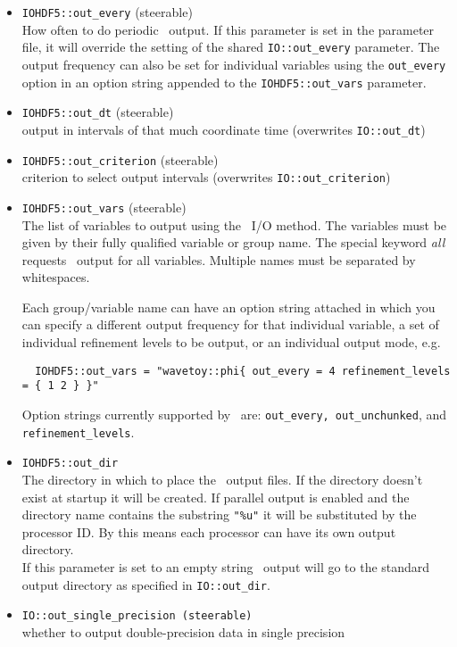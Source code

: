 \documentclass{article}
\begin{document}
\begin{itemize}
  \item {\tt IOHDF5::out\_every} (steerable)\\
        How often to do periodic \ThisThorn\ output. If this parameter is set
        in the parameter file, it will override the setting of the shared
        {\tt IO::out\_every} parameter. The output frequency can also be set
        for individual variables using the {\tt out\_every} option in an option
        string appended to the {\tt IOHDF5::out\_vars} parameter.

  \item {\tt IOHDF5::out\_dt} (steerable)\\
        output in intervals of that much coordinate time (overwrites {\tt IO::out\_dt})

  \item {\tt IOHDF5::out\_criterion} (steerable)\\
        criterion to select output intervals (overwrites {\tt IO::out\_criterion})

  \item {\tt IOHDF5::out\_vars} (steerable)\\
        The list of variables to output using the \ThisThorn\ I/O method.
        The variables must be given by their fully qualified variable or group
        name. The special keyword {\it all} requests \ThisThorn\ output for
        all variables. Multiple names must be separated by whitespaces.

        Each group/variable name can have an option string attached in which you
        can specify a different output frequency for that individual variable,
	a set of individual refinement levels to be output, or an individual
        output mode, e.g.
\begin{verbatim}
  IOHDF5::out_vars = "wavetoy::phi{ out_every = 4 refinement_levels = { 1 2 } }"
\end{verbatim}
        Option strings currently supported by \ThisThorn\ are: {\tt out\_every, out\_unchunked}, and {\tt refinement\_levels}.

  \item {\tt IOHDF5::out\_dir}\\
        The directory in which to place the \ThisThorn\ output files.
        If the directory doesn't exist at startup it will be created.
        If parallel output is enabled and the directory name contains the
        substring {\tt "\%u"} it will be substituted by the processor ID.
        By this means each processor can have its own output directory.\\
        If this parameter is set to an empty string \ThisThorn\ output will go
        to the standard output directory as specified in {\tt IO::out\_dir}.

  \item {\tt IO::out\_single\_precision (steerable)}\\
        whether to output double-precision data in single precision

\end{itemize}
\end{document}
